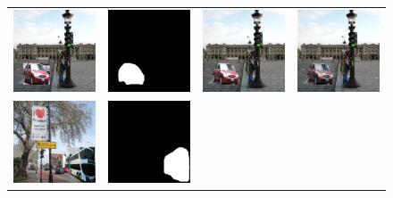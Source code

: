 \begin{figure}[h!]
\centering
\small
\begin{tabular}{cccc}
  \includegraphics[width=.24\textwidth]{figures/guided/000000026204_input.jpg}&
  \includegraphics[width=.24\textwidth]{figures/guided/000000026204_mask.jpg}&
  \includegraphics[width=.24\textwidth]{figures/guided/000000026204_inpainting.jpg}&
  \includegraphics[width=.24\textwidth]{figures/guided/000000026204_inpainting_harmonization.jpg} \\
  \includegraphics[width=.24\textwidth]{figures/guided/000000095843_input.jpg}&
  \includegraphics[width=.24\textwidth]{figures/guided/000000095843_mask.jpg}&

\end{tabular}
\end{figure}
